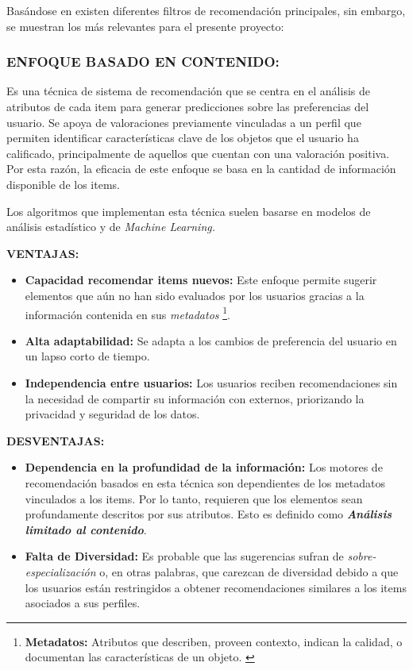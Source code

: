 Basándose en \parencite{ISINKAYE2015261} existen diferentes filtros de recomendación principales, sin embargo, se muestran los más relevantes para el presente proyecto:

\subsubsection[BASADO EN CONTENIDO]{ENFOQUE BASADO EN CONTENIDO: }
Es una técnica de sistema de recomendación que se centra en el análisis de atributos de cada item para generar predicciones sobre las preferencias del usuario. Se apoya de valoraciones previamente vinculadas a un perfil que permiten identificar características clave de los objetos que el usuario ha calificado, principalmente de aquellos que cuentan con una valoración positiva.  Por esta razón, la eficacia de este enfoque se basa en la cantidad de información disponible de los items.

Los algoritmos que implementan esta técnica suelen basarse en modelos de análisis estadístico y de \textit{Machine Learning.}

\textbf{VENTAJAS: }
\begin{itemize}

    \item \textbf{Capacidad recomendar items nuevos: } Este enfoque permite sugerir elementos que aún no han sido evaluados por los usuarios gracias a la información contenida en sus \textit{metadatos} \footnote{\textbf{Metadatos: } Atributos que describen, proveen contexto, indican la calidad, o documentan las características de un objeto. \parencite{Greenberg09092005}}.
    \item \textbf{Alta adaptabilidad: } Se adapta a los cambios de preferencia del usuario en un lapso corto de tiempo.

    \item \textbf{Independencia entre usuarios: } Los usuarios reciben recomendaciones sin la necesidad de compartir su información con externos, priorizando la privacidad y seguridad de los datos.
    
\end{itemize}

\newpage
\thispagestyle{plain}
\vspace*{0.2cm}

\textbf{DESVENTAJAS: }
\begin{itemize}

    \item \textbf{Dependencia en la profundidad de la información: } Los motores de recomendación basados en esta técnica son dependientes de los metadatos vinculados a los items. Por lo tanto, requieren que los elementos sean profundamente descritos por sus atributos. Esto es definido como \textbf{\textit{Análisis limitado al contenido}}.
    
    \item \textbf{Falta de Diversidad: } Es probable que las sugerencias sufran de \textit{sobre-especialización} o, en otras palabras, que carezcan de diversidad debido a que los usuarios están restringidos a obtener recomendaciones similares a los items asociados a sus perfiles.
\end{itemize}


